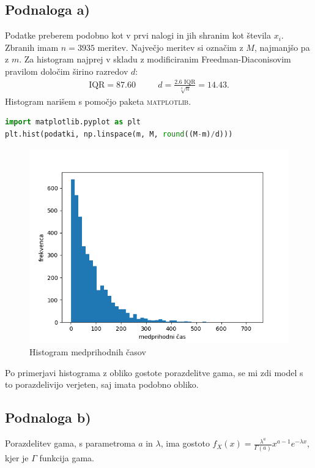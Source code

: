 \documentclass[12pt, a4paper]{article}
\begin{document}
\subsection*{Podnaloga a)}
Podatke preberem podobno kot v prvi nalogi in jih shranim kot števila $x_i$. Zbranih imam $n = 3935$ meritev. Največjo meritev si označim z $M$, najmanjšo pa z $m$. Za histogram najprej v skladu z modificiranim Freedman-Diaconisovim pravilom določim širino razredov $d$:
\begin{align*}
\text{IQR} = 87.60 & \quad &  d = \frac{2.6 \text{ IQR}}{\sqrt[3]{n}} = 14.43.
\end{align*}
Histogram narišem s pomočjo paketa \textsc{matplotlib}.
\begin{lstlisting}[language=Python]
import matplotlib.pyplot as plt
plt.hist(podatki, np.linspace(m, M, round((M-m)/d)))
\end{lstlisting}
\begin{figure}[h!]
\includegraphics[width=\linewidth]{histogram_osnovno.png}
\centering
\caption{Histogram medprihodnih časov}
\end{figure}

Po primerjavi histograma z obliko gostote porazdelitve gama, se mi zdi model s to porazdelivijo verjeten, saj imata podobno obliko.

\subsection*{Podnaloga b)}
Porazdelitev gama, s parametroma $a$ in $\lambda$, ima gostoto $f_X(x) = \frac{\lambda^a}{\Gamma (a)}x^{a-1}e^{-\lambda x}$, kjer je $\Gamma$ funkcija gama.
\end{document}
